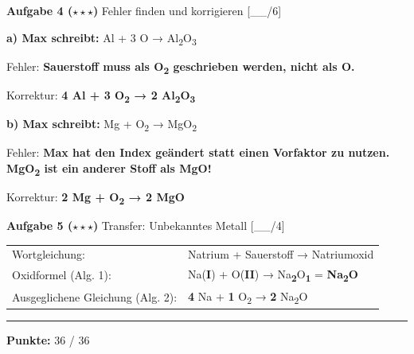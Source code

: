 \documentclass[10pt, a4paper]{article}
\newcommand{\maxpunkte}{36}
\newcommand{\lsg}[1]{\textcolor{loesung}{\textbf{#1}}}
\newcommand{\punktebox}[1]{\hfill\small\textcolor{mittelgrau}{[\_\_/#1]}}
\newcommand{\aufgabe}[2]{%
    \vspace{6pt}%
    \noindent\textbf{\textcolor{fachfarbe}{Aufgabe #1}} #2%
    \vspace{3pt}%
    \nopagebreak[4]%
}
\begin{document}
\vspace{8pt}


\aufgabe{4 ($\star\star\star$)}{Fehler finden und korrigieren} \punktebox{6}

\textbf{a) Max schreibt:}  Al + 3 O → Al\textsubscript{2}O\textsubscript{3}

\vspace{2pt}
Fehler: \lsg{Sauerstoff muss als O\textsubscript{2} geschrieben werden, nicht als O.}

Korrektur: \lsg{4 Al + 3 O\textsubscript{2} → 2 Al\textsubscript{2}O\textsubscript{3}}

\vspace{4pt}

\textbf{b) Max schreibt:} \quad Mg + O\textsubscript{2} → MgO\textsubscript{2}

\vspace{2pt}
Fehler: \lsg{Max hat den Index geändert statt einen Vorfaktor zu nutzen. MgO\textsubscript{2} ist ein anderer Stoff als MgO!}

Korrektur: \lsg{2 Mg + O\textsubscript{2} → 2 MgO}

\vspace{8pt}


\aufgabe{5 ($\star\star\star$)}{Transfer: Unbekanntes Metall} \punktebox{4}

\vspace{4pt}
\begin{tabular}{@{}ll@{}}
Wortgleichung: & Natrium + Sauerstoff → Natriumoxid \\[0.5em]
Oxidformel (Alg. 1): & Na(\lsg{I}) + O(\lsg{II}) → Na\textsubscript{\lsg{2}}O\textsubscript{\lsg{1}} = \lsg{Na\textsubscript{2}O} \\[0.5em]
Ausgeglichene Gleichung (Alg. 2): & \lsg{4} Na + \lsg{1} O\textsubscript{2} → \lsg{2} Na\textsubscript{2}O \\
\end{tabular}


\vfill
\hrule
\vspace{0.3em}
\hfill\textbf{Punkte:} \textcolor{loesung}{36} / \maxpunkte
\end{document}

